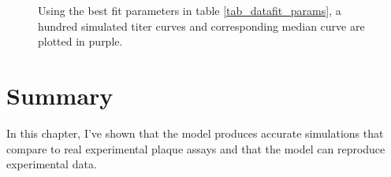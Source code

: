 \begin{figure}
\centering
    \parbox{\textwidth}{

    \vspace{0.5em}
    }
\caption{Using the best fit parameters in table \ref{tab_datafit_params}, a hundred simulated titer curves and corresponding median curve are plotted in purple. \label{fig_FitRuns}}
\end{figure}

\section{Summary}

In this chapter, I've shown that the model produces accurate simulations that compare to real experimental plaque assays and that the model can reproduce experimental data.






